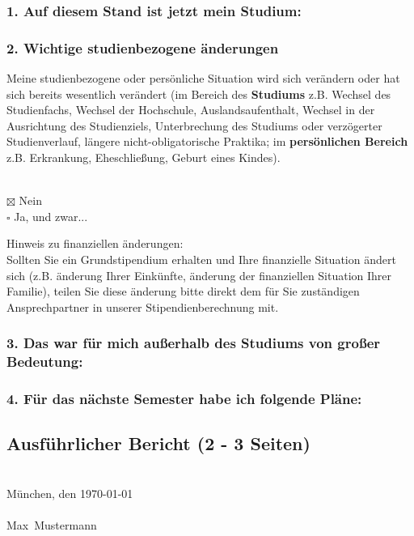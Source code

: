 \documentclass[a4paper,10pt]{article}
\newcommand{\Datum}{\today}
\newcommand{\Nachname}{Mustermann}
\newcommand{\Vorname}{Max}
\newcommand{\Ort}{München}
\begin{document}
    \subsubsection{1. Auf diesem Stand ist jetzt mein Studium:}

    \blindtext

    \subsubsection{2. Wichtige studienbezogene änderungen}
    \begin{framed}
        \noindent
        Meine studienbezogene oder persönliche Situation wird sich verändern oder hat sich bereits wesentlich verändert
        (im Bereich des \textbf{Studiums} z.B. Wechsel des Studienfachs, Wechsel der Hochschule, Auslandsaufenthalt,
        Wechsel in der Ausrichtung des Studienziels, Unterbrechung des Studiums oder verzögerter Studienverlauf,
        längere nicht-obligatorische Praktika;
        im \textbf{persönlichen Bereich} z.B. Erkrankung, Eheschließung, Geburt eines Kindes).
    \end{framed}

    ~\\
    $\boxtimes$ Nein
    ~\\
    $\square$ Ja, und zwar...

    \begin{framed}
        \noindent
        \small{Hinweis zu finanziellen änderungen:\\
        Sollten Sie ein Grundstipendium erhalten und Ihre finanzielle Situation ändert sich (z.B. änderung Ihrer Einkünfte,
        änderung der finanziellen Situation Ihrer Familie), teilen Sie diese änderung bitte direkt dem für Sie
        zuständigen
        Ansprechpartner in unserer Stipendienberechnung mit.} \normalsize
    \end{framed}
    \subsubsection{3. Das war für mich außerhalb des Studiums von großer Bedeutung:}

    \blindtext

    \subsubsection{4. Für das nächste Semester habe ich folgende Pläne:}

    \blindtext

    \newpage

    \subsection{Ausführlicher Bericht (2 - 3 Seiten)}

    \Blindtext

    ~\\
    \Ort, den \Datum\\
    \\
    \Vorname~\Nachname
\end{document}
